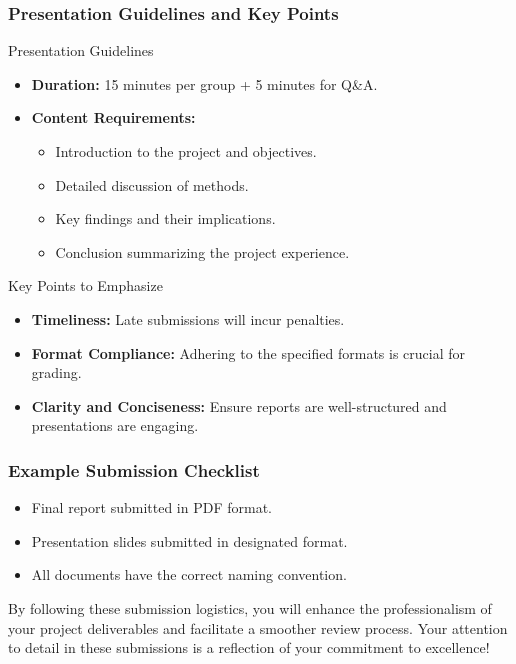 \documentclass[aspectratio=169]{beamer}
\begin{document}
\begin{frame}[fragile]
    \frametitle{Presentation Guidelines and Key Points}
    \begin{block}{Presentation Guidelines}
        \begin{itemize}
            \item \textbf{Duration:} 15 minutes per group + 5 minutes for Q\&A.
            \item \textbf{Content Requirements:}
                \begin{itemize}
                    \item Introduction to the project and objectives.
                    \item Detailed discussion of methods.
                    \item Key findings and their implications.
                    \item Conclusion summarizing the project experience.
                \end{itemize}
        \end{itemize}
    \end{block}

    \begin{block}{Key Points to Emphasize}
        \begin{itemize}
            \item \textbf{Timeliness:} Late submissions will incur penalties.
            \item \textbf{Format Compliance:} Adhering to the specified formats is crucial for grading.
            \item \textbf{Clarity and Conciseness:} Ensure reports are well-structured and presentations are engaging.
        \end{itemize}
    \end{block}
\end{frame}

\begin{frame}[fragile]
    \frametitle{Example Submission Checklist}
    \begin{itemize}
        \item [ ] Final report submitted in PDF format.
        \item [ ] Presentation slides submitted in designated format.
        \item [ ] All documents have the correct naming convention.
    \end{itemize}

    By following these submission logistics, you will enhance the professionalism of your project deliverables and facilitate a smoother review process. Your attention to detail in these submissions is a reflection of your commitment to excellence!
\end{frame}
\end{document}
